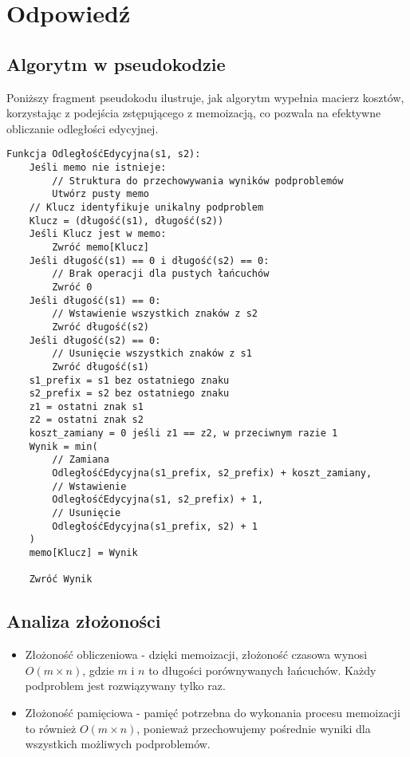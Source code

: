 \section{Odpowiedź}
\subsection{Algorytm w pseudokodzie}
Poniższy fragment pseudokodu ilustruje, jak algorytm wypełnia macierz kosztów, korzystając z podejścia zstępującego z memoizacją, co pozwala na efektywne obliczanie odległości edycyjnej.

\begin{verbatim}
Funkcja OdległośćEdycyjna(s1, s2):
    Jeśli memo nie istnieje:
        // Struktura do przechowywania wyników podproblemów
        Utwórz pusty memo
    // Klucz identyfikuje unikalny podproblem
    Klucz = (długość(s1), długość(s2))
    Jeśli Klucz jest w memo:
        Zwróć memo[Klucz]
    Jeśli długość(s1) == 0 i długość(s2) == 0:
        // Brak operacji dla pustych łańcuchów
        Zwróć 0
    Jeśli długość(s1) == 0:
        // Wstawienie wszystkich znaków z s2
        Zwróć długość(s2)
    Jeśli długość(s2) == 0:
        // Usunięcie wszystkich znaków z s1
        Zwróć długość(s1)
    s1_prefix = s1 bez ostatniego znaku
    s2_prefix = s2 bez ostatniego znaku
    z1 = ostatni znak s1
    z2 = ostatni znak s2
    koszt_zamiany = 0 jeśli z1 == z2, w przeciwnym razie 1
    Wynik = min(
        // Zamiana
        OdległośćEdycyjna(s1_prefix, s2_prefix) + koszt_zamiany,
        // Wstawienie
        OdległośćEdycyjna(s1, s2_prefix) + 1,
        // Usunięcie
        OdległośćEdycyjna(s1_prefix, s2) + 1
    )
    memo[Klucz] = Wynik
    
    Zwróć Wynik  
\end{verbatim}

\subsection{Analiza złożoności}
\begin{itemize}
    \item Złożoność obliczeniowa - dzięki memoizacji, złożoność czasowa wynosi \(O(m \times n)\), gdzie \(m\) i \(n\) to długości porównywanych łańcuchów. Każdy podproblem jest rozwiązywany tylko raz.
    \item Złożoność pamięciowa - pamięć potrzebna do wykonania procesu memoizacji to również \(O(m \times n)\), ponieważ przechowujemy pośrednie wyniki dla wszystkich możliwych podproblemów.
\end{itemize}

